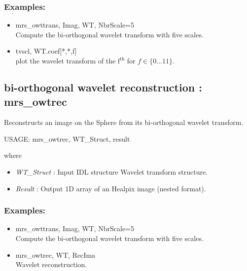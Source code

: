 \subsubsection*{Examples:} 
\begin{itemize}
\item  mrs\_owttrans, Imag, WT, NbrScale=5  \\
Compute the bi-orthogonal wavelet transform with five scales.
\item  tvscl, WT.coef[*,*,f] \\
plot the wavelet transform of the $\textrm{f}^{\textrm{th}}$ for $f \in \{0\ldots 11\}$.
\end{itemize}


\subsection{bi-orthogonal wavelet reconstruction : mrs\_owtrec}
Reconstructs an image on the Sphere from its bi-orthogonal wavelet transform.   
 {\bf
\begin{center}
     USAGE: mrs\_owtrec, WT\_Struct, result  
\end{center}}
where 
\begin{itemize}
\item {\em WT\_Struct} : Input IDL structure Wavelet transform structure.
\item {\em Result} : Output 1D array of an Healpix image (nested format).
\end{itemize}

\subsubsection*{Examples:} 
\begin{itemize}
\item  mrs\_owttrans, Imag, WT, NbrScale=5 \\
Compute the bi-orthogonal wavelet transform with five scales.
\item  mrs\_owtrec, WT, RecIma \\
Wavelet reconstruction. 
\end{itemize}



